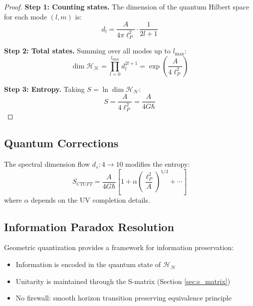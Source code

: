 \begin{proof}
\textbf{Step 1: Counting states.} The dimension of the quantum Hilbert space for each mode $(l, m)$ is:
\begin{equation}
    d_l = \frac{A}{4\pi \ell_P^2} \cdot \frac{1}{2l + 1}
\end{equation}

\textbf{Step 2: Total states.} Summing over all modes up to $l_{\max}$:
\begin{equation}
    \dim \mathcal{H}_{\mathcal{H}} = \prod_{l=0}^{l_{\max}} d_l^{2l+1} = \exp\left(\frac{A}{4\ell_P^2}\right)
\end{equation}

\textbf{Step 3: Entropy.} Taking $S = \ln \dim \mathcal{H}_{\mathcal{H}}$:
\begin{equation}
    S = \frac{A}{4\ell_P^2} = \frac{A}{4G\hbar}
\end{equation}
\end{proof}

\subsection{Quantum Corrections}

The spectral dimension flow $d_s: 4 \to 10$ modifies the entropy:
\begin{equation}
    S_{CTUFT} = \frac{A}{4G\hbar} \left[1 + \alpha \left(\frac{\ell_P^2}{A}\right)^{1/3} + \cdots\right]
\end{equation}
where $\alpha$ depends on the UV completion details.

\subsection{Information Paradox Resolution}

Geometric quantization provides a framework for information preservation:
\begin{itemize}
    \item Information is encoded in the quantum state of $\mathcal{H}_{\mathcal{H}}$
    \item Unitarity is maintained through the S-matrix (Section \ref{sec:s_matrix})
    \item No firewall: smooth horizon transition preserving equivalence principle
\end{itemize}
